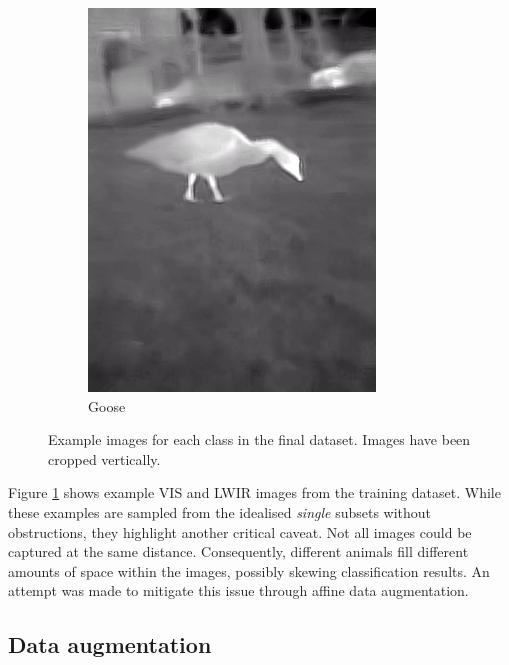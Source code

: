 \documentclass{l4proj}
\begin{document}
\begin{figure}[ht]
\begin{subfigure}[h!]{0.18\textwidth}
    \includegraphics[width=\textwidth, trim={0cm 1.6cm 0cm 1.6cm}, clip]{images/dataset/goose/lwir.png}
    \caption{Goose}
  \end{subfigure}
  \caption{Example images for each class in the final dataset. Images have been cropped vertically.}
  \label{fig:dataset_classes}
\end{figure}

Figure \ref{fig:dataset_classes} shows example VIS and LWIR images from the training dataset. While these examples are sampled from the idealised \textit{single} subsets without obstructions, they highlight another critical caveat. Not all images could be captured at the same distance. Consequently, different animals fill different amounts of space within the images, possibly skewing classification results. An attempt was made to mitigate this issue through affine data augmentation.

\subsection{Data augmentation}
\end{document}
